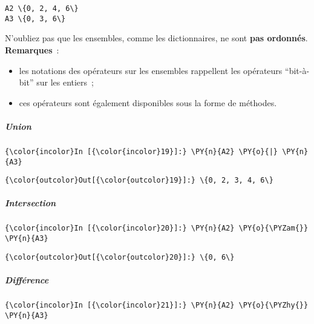     \begin{Verbatim}[commandchars=\\\{\}]
A2 \{0, 2, 4, 6\}
A3 \{0, 3, 6\}

    \end{Verbatim}

    N'oubliez pas que les ensembles, comme les dictionnaires, ne sont
\textbf{pas ordonnés}.\\

    \textbf{Remarques}~:
    
\begin{itemize}
	\item 
    les notations des opérateurs sur les ensembles
	rappellent les opérateurs ``bit-à-bit'' sur les entiers~;
	\item
	ces opérateurs sont également disponibles sous la forme de méthodes.
\end{itemize}

    \hypertarget{union}{%
\subparagraph{Union}\label{union}}

    \begin{Verbatim}[commandchars=\\\{\}]
{\color{incolor}In [{\color{incolor}19}]:} \PY{n}{A2} \PY{o}{|} \PY{n}{A3}
\end{Verbatim}


\begin{Verbatim}[commandchars=\\\{\}]
{\color{outcolor}Out[{\color{outcolor}19}]:} \{0, 2, 3, 4, 6\}
\end{Verbatim}
            
    \hypertarget{intersection}{%
\subparagraph{Intersection}\label{intersection}}

    \begin{Verbatim}[commandchars=\\\{\}]
{\color{incolor}In [{\color{incolor}20}]:} \PY{n}{A2} \PY{o}{\PYZam{}} \PY{n}{A3}
\end{Verbatim}


\begin{Verbatim}[commandchars=\\\{\}]
{\color{outcolor}Out[{\color{outcolor}20}]:} \{0, 6\}
\end{Verbatim}
            
    \hypertarget{diffuxe9rence}{%
\subparagraph{Différence}\label{diffuxe9rence}}

    \begin{Verbatim}[commandchars=\\\{\}]
{\color{incolor}In [{\color{incolor}21}]:} \PY{n}{A2} \PY{o}{\PYZhy{}} \PY{n}{A3}
\end{Verbatim}


